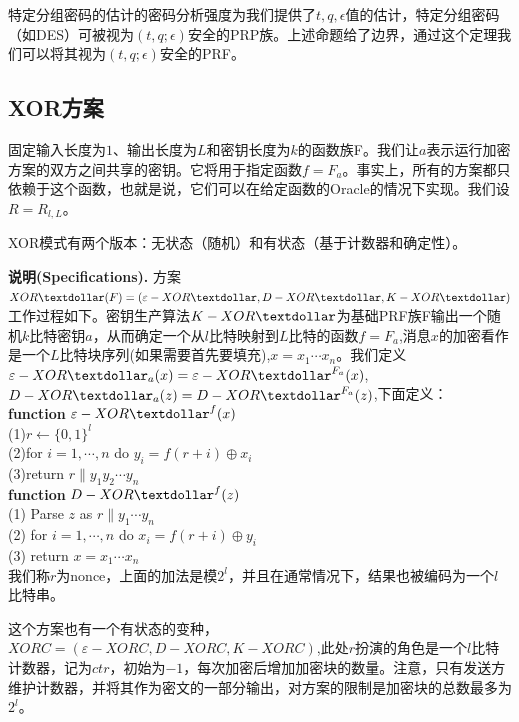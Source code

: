 \documentclass[]{article}
\begin{document}
特定分组密码的估计的密码分析强度为我们提供了$t,q,\epsilon$值的估计，特定分组密码（如DES）可被视为$(t,q;\epsilon)$安全的PRP族。上述命题给了边界，通过这个定理我们可以将其视为$(t,q;\epsilon)$安全的PRF。

\subsection{XOR方案}
固定输入长度为$1$、输出长度为$L$和密钥长度为$k$的函数族F。我们让$a$表示运行加密方案的双方之间共享的密钥。它将用于指定函数$f=F_a$。事实上，所有的方案都只依赖于这个函数，也就是说，它们可以在给定函数的Oracle的情况下实现。我们设$R=R_{l,L}$。

XOR模式有两个版本：无状态（随机）和有状态（基于计数器和确定性）。

\textbf{{\large 说明(Specifications).}}  方案$XOR\textdollar(F)=(\varepsilon-XOR\textdollar,D-XOR\textdollar,K-XOR\textdollar)$ 工作过程如下。密钥生产算法$K-XOR\textdollar$为基础PRF族F输出一个随机$k$比特密钥$a$，从而确定一个从$l$比特映射到$L$比特的函数$f=F_a$,消息$x$的加密看作是一个$L$比特块序列(如果需要首先要填充),$x=x_1\cdots x_n$。我们定义$\varepsilon-XOR\textdollar_a(x) = \varepsilon-XOR\textdollar^{F_a}(x)$,$D-XOR\textdollar_a(z) = D-XOR\textdollar^{F_a}(z)$,下面定义：\\
\textbf{function} $\varepsilon-XOR\textdollar^f(x)$\\
(1)$r\leftarrow \{0,1\}^l$\\
(2)for $i=1,\cdots,n$ do $y_i=f(r+i)\oplus x_i$\\
(3)return $r\parallel y_1y_2\cdots y_n$\\
\textbf{function} $D-XOR\textdollar^f(z)$\\
(1) Parse $z$ as $r \parallel y_1\cdots y_n$\\
(2) for $i=1,\cdots,n$ do $x_i=f(r+i)\oplus y_i$\\
(3) return $x=x_1\cdots x_n$\\
我们称$r$为nonce，上面的加法是模$2^l$，并且在通常情况下，结果也被编码为一个$l$比特串。

这个方案也有一个有状态的变种，$XORC = (\varepsilon-XORC,D-XORC,K-XORC)$,此处$r$扮演的角色是一个$l$比特计数器，记为$ctr$，初始为$-1$，每次加密后增加加密块的数量。注意，只有发送方维护计数器，并将其作为密文的一部分输出，对方案的限制是加密块的总数最多为$2^l$。
\end{document}

